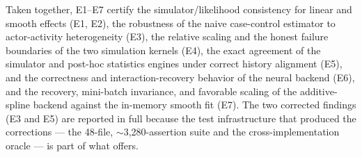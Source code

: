 Taken together, E1--E7 certify the simulator/likelihood consistency for
linear and smooth effects (E1, E2), the robustness of the naive
case-control estimator to actor-activity heterogeneity (E3), the relative
scaling and the honest failure boundaries of the two simulation kernels
(E4), the exact agreement of the simulator and post-hoc statistics engines
under correct history alignment (E5), and the correctness and
interaction-recovery behavior of the neural backend (E6), and the recovery, mini-batch invariance, and favorable scaling of the additive-spline backend against the in-memory smooth fit (E7). The two corrected
findings (E3 and E5) are reported in full because the test infrastructure
that produced the corrections --- the 48-file, $\sim$3{,}280-assertion suite
and the cross-implementation oracle --- is part of what  offers.
